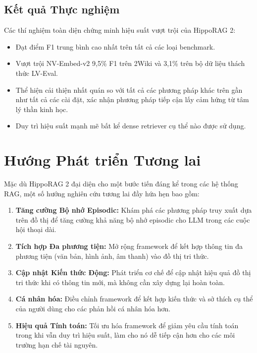 \documentclass[../main.tex]{subfiles}
\begin{document}
\subsection{Kết quả Thực nghiệm}
Các thí nghiệm toàn diện chứng minh hiệu suất vượt trội của HippoRAG 2:

\begin{itemize}
\item Đạt điểm F1 trung bình cao nhất trên tất cả các loại benchmark.
\item Vượt trội NV-Embed-v2 9,5\% F1 trên 2Wiki và 3,1\% trên bộ dữ liệu thách thức LV-Eval.
\item Thể hiện cải thiện nhất quán so với tất cả các phương pháp khác trên gần như tất cả các cài đặt, xác nhận phương pháp tiếp cận lấy cảm hứng từ tâm lý thần kinh học.
\item Duy trì hiệu suất mạnh mẽ bất kể dense retriever cụ thể nào được sử dụng.
\end{itemize}

\section{Hướng Phát triển Tương lai}
Mặc dù HippoRAG 2 đại diện cho một bước tiến đáng kể trong các hệ thống RAG, một số hướng nghiên cứu tương lai đầy hứa hẹn bao gồm:

\begin{enumerate}
\item \textbf{Tăng cường Bộ nhớ Episodic:} Khám phá các phương pháp truy xuất dựa trên đồ thị để tăng cường khả năng bộ nhớ episodic cho LLM trong các cuộc hội thoại dài.

\item \textbf{Tích hợp Đa phương tiện:} Mở rộng framework để kết hợp thông tin đa phương tiện (văn bản, hình ảnh, âm thanh) vào đồ thị tri thức.

\item \textbf{Cập nhật Kiến thức Động:} Phát triển cơ chế để cập nhật hiệu quả đồ thị tri thức khi có thông tin mới, mà không cần xây dựng lại hoàn toàn.

\item \textbf{Cá nhân hóa:} Điều chỉnh framework để kết hợp kiến thức và sở thích cụ thể của người dùng cho các phản hồi cá nhân hóa hơn.

\item \textbf{Hiệu quả Tính toán:} Tối ưu hóa framework để giảm yêu cầu tính toán trong khi vẫn duy trì hiệu suất, làm cho nó dễ tiếp cận hơn cho các môi trường hạn chế tài nguyên.
\end{enumerate}
\end{document}
